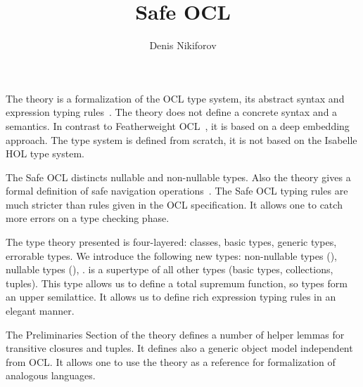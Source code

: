 \documentclass[11pt,a4paper]{book}
\makeatletter
\newenvironment{abstract}{%
  \small
  \begin{center}%
    {\bfseries \abstractname\vspace{-.5em}\vspace{\z@}}%
  \end{center}%
  \quotation}{\endquotation}
\makeatother
\begin{document}
\title{Safe OCL}
\author{Denis Nikiforov}
\maketitle

\begin{abstract}
  The theory is a formalization of the OCL type system,
  its abstract syntax and expression typing rules~\cite{OCL24}.
  The theory does not define a concrete syntax and a semantics.
  In contrast to Featherweight OCL~\cite{Featherweight_OCL-AFP},
  it is based on a deep embedding approach. The type system is defined
  from scratch, it is not based on the Isabelle HOL type system.

  The Safe OCL distincts nullable and non-nullable types. Also
  the theory gives a formal definition of safe navigation
  operations~\cite{DBLP:conf/models/Willink15}. The Safe OCL typing rules
  are much stricter than rules given in the OCL specification.
  It allows one to catch more errors on a type checking phase.

  The type theory presented is four-layered: classes, basic types,
  generic types, errorable types. We introduce the following new types:
  non-nullable types (),
  nullable types (\isa{{\isasymtau}{\isacharbrackleft}{\isacharquery}{\isacharbrackright}}),
  .  is a supertype of all other types
  (basic types, collections, tuples). This type allows us to define
  a total supremum function, so types form an upper semilattice.
  It allows us to define rich expression typing rules in an elegant manner.

  The Preliminaries Section of the theory defines a number of
  helper lemmas for transitive closures and tuples. It defines also
  a generic object model independent from OCL. It allows one to use
  the theory as a reference for formalization of analogous languages.
\end{abstract}

\tableofcontents





\end{document}
